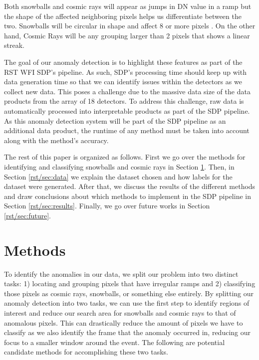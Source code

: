 Both snowballs and cosmic rays will appear as jumps in DN value in a ramp but the shape of the affected neighboring pixels helps us differentiate between the two.
Snowballs will be circular in shape and affect 8 or more pixels \parencite{cillis2018snowballs}.
On the other hand, Cosmic Rays will be any grouping larger than 2 pixels that shows a linear streak. 

The goal of our anomaly detection is to highlight these features as part of the RST WFI SDP's pipeline. 
As such, SDP's processing time should keep up with data generation time so that we can identify issues within the detectors as we collect new data. 
This poses a challenge due to the massive data size of the data products from the array of 18 detectors. 
To address this challenge, raw data is automatically processed into interpretable products as part of the SDP pipeline. 
As this anomaly detection system will be part of the SDP pipeline as an additional data product, the runtime of any method must be taken into account along with the method's accuracy. 

The rest of this paper is organized as follows.
First we go over the methods for identifying and classifying snowballs and cosmic rays in Section \ref{rst/sec:methods}.
Then, in Section \ref{rst/sec:data} we explain the dataset chosen and how labels for the dataset were generated.
After that, we discuss the results of the different methods and draw conclusions about which methods to implement in the SDP pipeline in Section \ref{rst/sec:results}.
Finally, we go over future works in Section \ref{rst/sec:future}.

\section{Methods}
\label{rst/sec:methods}
To identify the anomalies in our data, we split our problem into two distinct tasks: 1) locating and grouping pixels that have irregular ramps and 2) classifying those pixels as cosmic rays, snowballs, or something else entirely.
By splitting our anomaly detection into two tasks, we can use the first step to identify regions of interest and reduce our search area for snowballs and cosmic rays to that of anomalous pixels.
This can drastically reduce the amount of pixels we have to classify as we also identify the frame that the anomaly occurred in, reducing our focus to a smaller window around the event. 
The following are potential candidate methods for accomplishing these two tasks.

